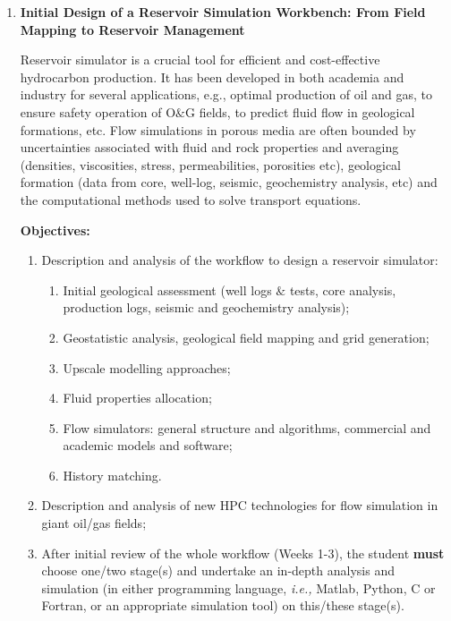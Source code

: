 \documentclass[12pts,a4paper,amsmath,amssymb,floatfix]{article}%
\newcommand{\ie}{{\it i.e., }}
\begin{document}

\begin{enumerate}[label=\bfseries Project: \arabic*:]


\item {\bf Initial Design of a Reservoir Simulation Workbench: From Field Mapping to Reservoir Management}
  
Reservoir simulator is a crucial tool for efficient and cost-effective hydrocarbon production. It has been developed in both academia and industry for several applications, e.g., optimal production of oil and gas, to ensure safety operation of O$\&$G fields, to predict fluid flow in geological formations, etc. Flow simulations in porous media are often bounded by uncertainties associated with fluid and rock properties and averaging (densities, viscosities, stress, permeabilities, porosities etc), geological formation (data from core, well-log, seismic, geochemistry analysis, etc) and the computational methods used to solve transport equations. 

\noindent
{\bf Objectives:}
\begin{enumerate}
\item Description and analysis of the workflow to design a reservoir simulator:
\begin{enumerate}
\item Initial geological assessment (well logs $\&$ tests, core analysis, production logs, seismic and geochemistry analysis);
\item Geostatistic analysis, geological field mapping and grid generation;
\item Upscale modelling approaches;
\item Fluid properties allocation;
\item Flow simulators: general structure and algorithms, commercial and academic models and software;
\item History matching.
\end{enumerate}
\item Description and analysis of new HPC technologies for flow simulation in giant oil/gas fields;
\item After initial review of the whole workflow (Weeks 1-3), the student {\bf must} choose one/two stage(s) and undertake an in-depth analysis and simulation (in either programming language, \ie Matlab, Python, C or Fortran, or an appropriate simulation tool) on this/these stage(s).
\end{enumerate}


\end{enumerate}
\end{document}
